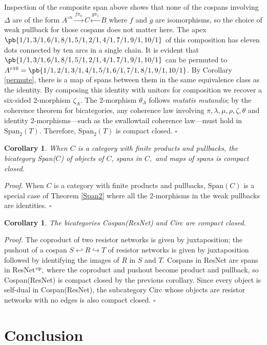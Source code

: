 \documentclass[12pt,twoside,openright]{report}
\newcommand{\op}{{\rm op}}
\newcommand{\Span}{\mbox{Span}}
\newtheorem{cor}[thm]{Corollary}
\begin{document}
Inspection of the composite span above shows that none of the cospans involving $\Delta$ are of the form $A^{\circ n} \stackrel{f\pi_n}{\to} C \stackrel{g\pi_1}{\leftarrow} B$ where $f$ and $g$ are isomorphisms, so the choice of weak pullback for those cospans does not matter here.  The apex $\pb{1/1,3/1,6/1,8/1,5/1,2/1,4/1,7/1,9/1,10/1}$ of this composition has eleven dots connected by ten arcs in a single chain.  It is evident that $\pb{1/1,3/1,6/1,8/1,5/1,2/1,4/1,7/1,9/1,10/1}$ can be permuted to $A^{\circ 10} = \pb{1/1,2/1,3/1,4/1,5/1,6/1,7/1,8/1,9/1,10/1}$.  By Corollary \ref{permute}, there is a map of spans between them in the same equivalence class as the identity.  By composing this identity with unitors for composition we recover a six-sided 2-morphism $\zeta_A.$  The 2-morphism $\theta_A$ follows {\em mutatis mutandis}; by the coherence theorem for bicategories, any coherence law involving $\pi, \lambda, \mu, \rho, \zeta, \theta$ and identity 2-morphisms---such as the swallowtail coherence law---must hold in $\Span_2(T).$   Therefore, $\Span_2(T)$ is compact closed. \hfill $\square$

\begin{cor}
  \label{span}
  When $C$ is a category with finite products and pullbacks, the bicategory Span($C$) of objects of $C$, spans in $C,$ and maps of spans is compact closed.
\end{cor}
{\em Proof.} When $C$ is a category with finite products and pullbacks,
$\Span(C)$ is a special case of Theorem \ref{Span2} where all the
2-morphisms in the weak pullbacks are identities. \hfill $\square$

\begin{cor}
  The bicategories Cospan(ResNet) and Circ are compact closed.
\end{cor}
{\em Proof.} The coproduct of two resistor networks is given by juxtaposition; the pushout of a cospan $S \hookleftarrow R
\hookrightarrow T$ of resistor networks is given by juxtaposition followed by identifying the images of $R$ in $S$ and $T$.  Cospans in ResNet are spans in ResNet${}^{\op},$ where the coproduct and pushout become product and pullback, so Cospan(ResNet) is compact closed by the previous corollary.  Since every object is self-dual in Cospan(ResNet), the subcategory Circ whose objects are resistor networks with no edges is also compact closed. \hfill $\square$

\section{Conclusion}
\end{document}
